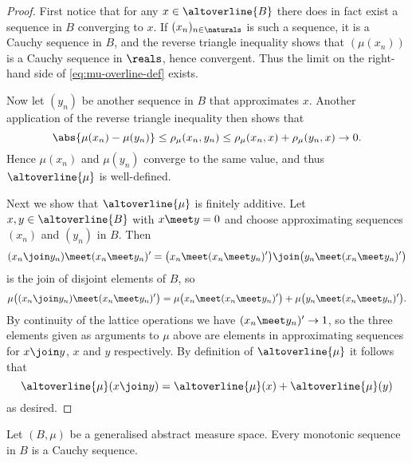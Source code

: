 \documentclass[article, a4paper, 11pt, oneside]{memoir}
\numberwithin{equation}{chapter}
\begin{document}
\begin{proof}
    First notice that for any $x \in \altoverline{B}$ there does in fact exist a sequence in $B$ converging to $x$. If $(x_n)_{n\in\naturals}$ is such a sequence, it is a Cauchy sequence in $B$, and the reverse triangle inequality shows that $(\mu(x_n))$ is a Cauchy sequence in $\reals$, hence convergent. Thus the limit on the right-hand side of \eqref{eq:mu-overline-def} exists.
    
    Now let $(y_n)$ be another sequence in $B$ that approximates $x$. Another application of the reverse triangle inequality then shows that
    \begin{equation*}
        \abs{ \mu(x_n) - \mu(y_n) }
            \leq \rho_\mu(x_n,y_n)
            \leq \rho_\mu(x_n,x) + \rho_\mu(y_n,x)
            \to 0.
    \end{equation*}
    Hence $\mu(x_n)$ and $\mu(y_n)$ converge to the same value, and thus $\altoverline{\mu}$ is well-defined.

    Next we show that $\altoverline{\mu}$ is finitely additive. Let $x,y \in \altoverline{B}$ with $x \meet y = 0$ and choose approximating sequences $(x_n)$ and $(y_n)$ in $B$. Then
    \begin{equation*}
        (x_n \join y_n) \meet (x_n \meet y_n)'
            = \bigl( x_n \meet (x_n \meet y_n)' \bigr)
              \join \bigl( y_n \meet (x_n \meet y_n)' \bigr)
    \end{equation*}
    is the join of disjoint elements of $B$, so
    \begin{equation*}
        \mu \bigl( (x_n \join y_n) \meet (x_n \meet y_n)' \bigr)
            = \mu \bigl( x_n \meet (x_n \meet y_n)' \bigr)
              + \mu \bigl( y_n \meet (x_n \meet y_n)' \bigr).
    \end{equation*}
    By continuity of the lattice operations we have $(x_n \meet y_n)' \to 1$, so the three elements given as arguments to $\mu$ above are elements in approximating sequences for $x \join y$, $x$ and $y$ respectively. By definition of $\altoverline{\mu}$ it follows that
    \begin{equation*}
        \altoverline{\mu}(x \join y)
            = \altoverline{\mu}(x) + \altoverline{\mu}(y)
    \end{equation*}
    as desired.
\end{proof}


\begin{lemma}
    \label{thm:monotonic-sequence-Cauchy}
    Let $(B,\mu)$ be a generalised abstract measure space. Every monotonic sequence in $B$ is a Cauchy sequence.
\end{lemma}
\end{document}

